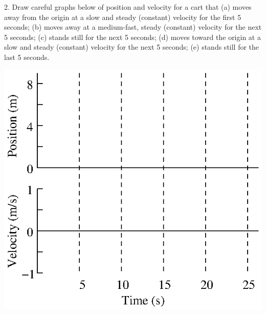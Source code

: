 2. Draw careful graphs below of position and velocity for a cart that (a) moves
away from the origin at a slow and steady (constant) velocity for the first
5 seconds; (b) moves away at a medium-fast, steady (constant) velocity for the
next 5 seconds; (c) stands still for the next 5 seconds; (d) moves toward the
origin at a slow and steady (constant) velocity for the next 5 seconds; (e)
stands still for the last 5 seconds.

\vspace{0.3cm}
{\par\centering \includegraphics{relating/relating_fig6.eps} \par}
\vspace{0.3cm}

